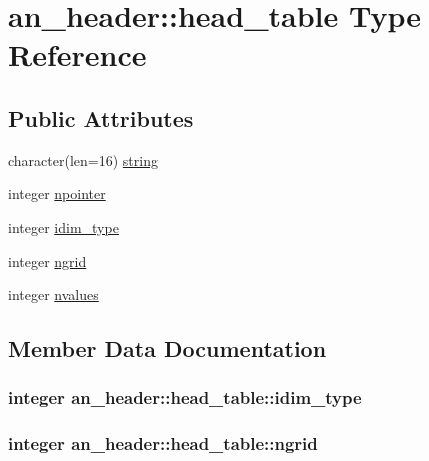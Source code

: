 \hypertarget{structan__header_1_1head__table}{}\section{an\+\_\+header\+:\+:head\+\_\+table Type Reference}
\label{structan__header_1_1head__table}
\subsection*{Public Attributes}
\begin{DoxyCompactItemize}
\item 
character(len=16) \hyperlink{structan__header_1_1head__table_a1be9d5f56131baf037a9da190f74189e}{string}
\item 
integer \hyperlink{structan__header_1_1head__table_ad73cf9ac7e4131420e4303aa425b183f}{npointer}
\item 
integer \hyperlink{structan__header_1_1head__table_a2c0e5e1896dce4260004d928663c8861}{idim\+\_\+type}
\item 
integer \hyperlink{structan__header_1_1head__table_acc79dab7891f45424b13bf4f0f179585}{ngrid}
\item 
integer \hyperlink{structan__header_1_1head__table_a75d0ca98f45425fdb8df177b5c2458e5}{nvalues}
\end{DoxyCompactItemize}


\subsection{Member Data Documentation}
\subsubsection[{\texorpdfstring{idim\+\_\+type}{idim_type}}]{\setlength{\rightskip}{0pt plus 5cm}integer an\+\_\+header\+::head\+\_\+table\+::idim\+\_\+type}\hypertarget{structan__header_1_1head__table_a2c0e5e1896dce4260004d928663c8861}{}\label{structan__header_1_1head__table_a2c0e5e1896dce4260004d928663c8861}
\subsubsection[{\texorpdfstring{ngrid}{ngrid}}]{\setlength{\rightskip}{0pt plus 5cm}integer an\+\_\+header\+::head\+\_\+table\+::ngrid}\hypertarget{structan__header_1_1head__table_acc79dab7891f45424b13bf4f0f179585}{}\label{structan__header_1_1head__table_acc79dab7891f45424b13bf4f0f179585}
